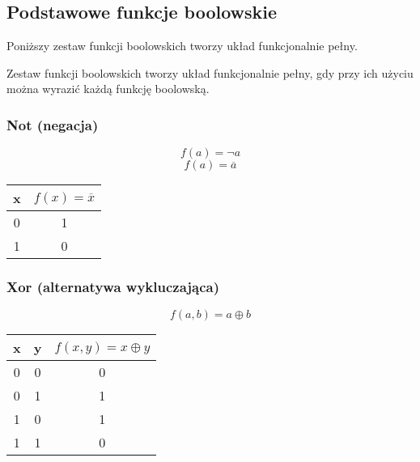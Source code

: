\subsection{Podstawowe funkcje boolowskie}
Poniższy zestaw funkcji boolowskich tworzy układ funkcjonalnie pełny.
\begin{definition}
    Zestaw funkcji boolowskich tworzy układ funkcjonalnie pełny, gdy przy ich użyciu można wyrazić każdą funkcję boolowską.
\end{definition}
\begin{paracol}{2}
\vspace*{\fill}
\subsubsection{Not (negacja)}
\[f(a) = \neg a\]
\[f(a) = \overline{a}\]
\begin{center}
    \begin{tabular}{| c | c |}
        \hline
        x & $f(x) = \overline{x}$ \\ 
        \hline
        0 & 1 \\ 
        1 & 0 \\ 
        \hline 
    \end{tabular}
\end{center}
\vspace*{\fill}
\switchcolumn
\vspace*{\fill}
\subsubsection{Xor (alternatywa wykluczająca)}
\[f(a,b) = a \oplus b\]
\begin{center}
    \begin{tabular}{| c  c | c |}
        \hline
        x & y & $f(x,y) = x \oplus y$ \\ 
        \hline
        0 & 0 & 0 \\ 
        0 & 1 & 1 \\ 
        1 & 0 & 1 \\ 
        1 & 1 & 0 \\ 
        \hline 
    \end{tabular}
\end{center}
\vspace*{\fill}
\end{paracol}
